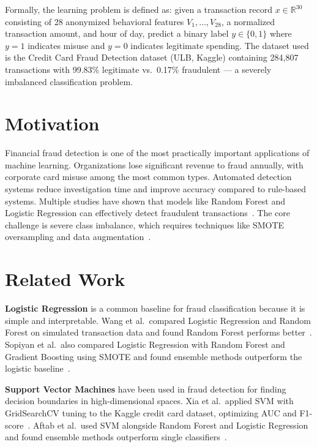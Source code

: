\documentclass{article}
\begin{document}
Formally, the learning problem is defined as: given a transaction record
$x \in \mathbb{R}^{30}$ consisting of 28 anonymized behavioral features
$V_1, \ldots, V_{28}$, a normalized transaction amount, and hour of day,
predict a binary label $y \in \{0, 1\}$ where $y = 1$ indicates misuse
and $y = 0$ indicates legitimate spending. The dataset used is the Credit
Card Fraud Detection dataset (ULB, Kaggle) containing 284,807 transactions
with 99.83\% legitimate vs.\ 0.17\% fraudulent --- a severely imbalanced
classification problem.

\section{Motivation}

Financial fraud detection is one of the most practically important
applications of machine learning. Organizations lose significant revenue
to fraud annually, with corporate card misuse among the most common types.
Automated detection systems reduce investigation time and improve accuracy
compared to rule-based systems. Multiple studies have shown that models
like Random Forest and Logistic Regression can effectively detect
fraudulent transactions~\cite{wang2023credit,hande2019credit}. The core
challenge is severe class imbalance, which requires techniques like SMOTE
oversampling and data augmentation~\cite{khalid2024enhancing,strelcenia2023improving}.

\section{Related Work}

\textbf{Logistic Regression} is a common baseline for fraud
classification because it is simple and interpretable. Wang et al.\
compared Logistic Regression and Random Forest on simulated transaction
data and found Random Forest performs better~\cite{wang2023credit}.
Sopiyan et al.\ also compared Logistic Regression with Random Forest and
Gradient Boosting using SMOTE and found ensemble methods outperform the
logistic baseline~\cite{sopiyan2022fraud}.

\textbf{Support Vector Machines} have been used in fraud detection for
finding decision boundaries in high-dimensional spaces. Xia et al.\
applied SVM with GridSearchCV tuning to the Kaggle credit card dataset,
optimizing AUC and F1-score~\cite{xia2022credit}. Aftab et al.\ used SVM
alongside Random Forest and Logistic Regression and found ensemble methods
outperform single classifiers~\cite{aftab2023fraud}.
\end{document}
